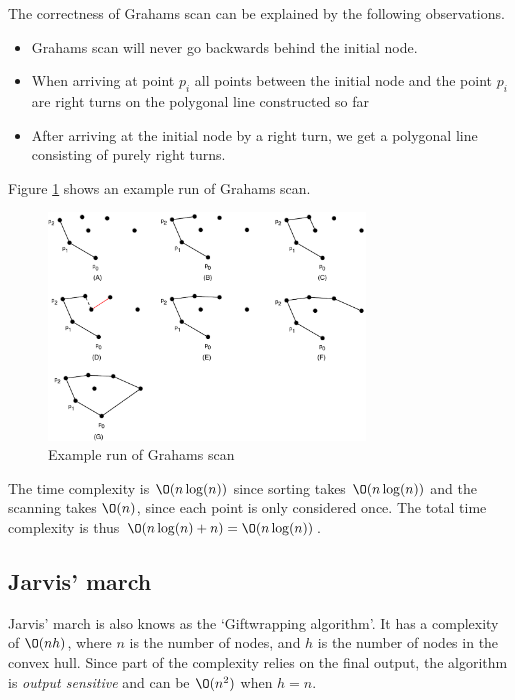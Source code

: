 \documentclass[10pt]{article}
\begin{document}
The correctness of Grahams scan can be explained by the following observations. 

\begin{itemize}
  \item Grahams scan will never go backwards behind the initial node. 
  \item When arriving at point $p_i$ all points between the initial node and the point $p_i$ are right turns on the polygonal line constructed so far
  \item After arriving at the initial node by a right turn, we get a polygonal line consisting of purely right turns. 
\end{itemize}

Figure \ref{fig16} shows an example run of Grahams scan.

\begin{figure}[ht]
\centering
\includegraphics[width=0.75\textwidth]{figures/fig16.pdf}
\caption{Example run of Grahams scan}
\label{fig16}
\end{figure}

The time complexity is $\O(n\log(n))$ since sorting takes $\O(n\log(n))$ and the scanning takes $\O(n)$, since each point is only considered once. The total time complexity is thus $\O(n\log(n)+n)=\O(n\log(n))$.


\subsection{Jarvis' march} %
\label{sub:jarvis_march}
Jarvis' march is also knows as the `Giftwrapping algorithm'. It has a complexity of $\O(nh)$, where $n$ is the number of nodes, and $h$ is the number of nodes in the convex hull. Since part of the complexity relies on the final output, the algorithm is \emph{output sensitive} and can be $\O(n^2)$ when $h=n$.
\end{document}
